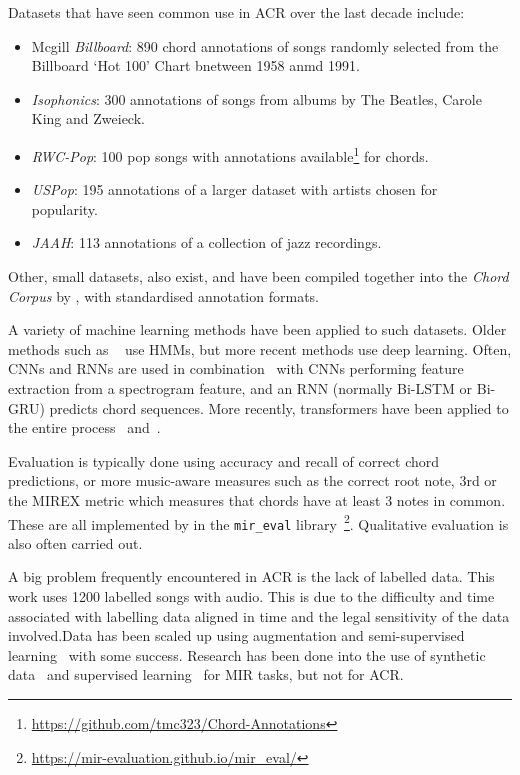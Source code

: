 Datasets that have seen common use in ACR over the last decade include:
\begin{itemize}
    \item Mcgill \emph{Billboard}: 890 chord annotations of songs randomly selected from the Billboard `Hot 100' Chart bnetween 1958 anmd 1991.~\citep{McgillBillboard}
    \item \emph{Isophonics}: 300 annotations of songs from albums by The Beatles, Carole King and Zweieck.~\citep{Isophonics}
    \item \emph{RWC-Pop}: 100 pop songs with annotations available\footnote{\url{https://github.com/tmc323/Chord-Annotations}} for chords.~\citep{RWC}
    \item \emph{USPop}: 195 annotations of a larger dataset with artists chosen for popularity.~\citep{USPop}
    \item \emph{JAAH}: 113 annotations of a collection of jazz recordings.~\cite{JAAH}
\end{itemize}

Other, small datasets, also exist, and have been compiled together into the \emph{Chord Corpus} by \citet{Choco}, with standardised annotation formats.

A variety of machine learning methods have been applied to such datasets. Older methods such as ~\cite{ACRHMM} use HMMs, but more recent methods use deep learning. Often, CNNs and RNNs are used in combination~\citep{ACRCNNRNN1,ACRLargeVocab1,ACRLargeVocab2} with CNNs performing feature extraction from a spectrogram feature, and an RNN (normally Bi-LSTM or Bi-GRU) predicts chord sequences. More recently, transformers have been applied to the entire process~\citet{MelodyTranscriptionViaGenerativePreTraining} and~\citet{HarmonyTransformer}.

Evaluation is typically done using accuracy and recall of correct chord predictions, or more music-aware measures such as the correct root note, 3rd or the MIREX metric which measures that chords have at least 3 notes in common. These are all implemented by \citet{MIREVAL} in the \texttt{mir\_eval} library~\footnote{\url{https://mir-evaluation.github.io/mir_eval/}}. Qualitative evaluation is also often carried out.

A big problem frequently encountered in ACR is the lack of labelled data. This work uses 1200 labelled songs with audio. This is due to the difficulty and time associated with labelling data aligned in time and the legal sensitivity of the data involved.Data has been scaled up using augmentation and semi-supervised learning~\citep{ScalingUpSemiSupervisedLearning} with some success. Research has been done into the use of synthetic data~\citep{MusicGenTrainingData,AnnotationFreeSyntheticData} and supervised learning~\citep{MERTSupervisedLearning} for MIR tasks, but not for ACR.

